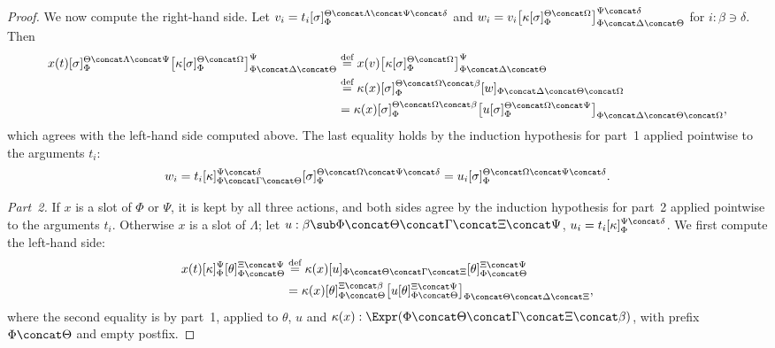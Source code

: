\begin{proof}
    We now compute the right-hand side. Let $v_i = t_i[\sigma]_\Phi^{\Theta \concat \Lambda \concat \Psi \concat \delta}$ and $w_i = v_i\big[\kappa[\sigma]_\Phi^{\Theta \concat \Omega}\big]_{\Phi \concat \Delta \concat \Theta}^{\Psi \concat \delta}$ for $i : \beta \ni \delta$. Then
    \begin{align*}
        x(t)[\sigma]_\Phi^{\Theta \concat \Lambda \concat \Psi}\big[\kappa[\sigma]_\Phi^{\Theta \concat \Omega}\big]_{\Phi \concat \Delta \concat \Theta}^{\Psi}
        &\overset{\textnormal{def}}{=} x(v)\big[\kappa[\sigma]_\Phi^{\Theta \concat \Omega}\big]_{\Phi \concat \Delta \concat \Theta}^{\Psi}\\
        &\overset{\textnormal{def}}{=} \kappa(x)[\sigma]_\Phi^{\Theta \concat \Omega \concat \beta}[w]_{\Phi \concat \Delta \concat \Theta \concat \Omega}\\
        &= \kappa(x)[\sigma]_\Phi^{\Theta \concat \Omega \concat \beta}\big[u[\sigma]_\Phi^{\Theta \concat \Omega \concat \Psi}\big]_{\Phi \concat \Delta \concat \Theta \concat \Omega},
    \end{align*}
    which agrees with the left-hand side computed above. The last equality holds by the induction hypothesis for part~1 applied pointwise to the arguments $t_i$:
    \[
    w_i = t_i[\kappa]_{\Phi \concat \Gamma \concat \Theta}^{\Psi \concat \delta}[\sigma]_\Phi^{\Theta \concat \Omega \concat \Psi \concat \delta} = u_i[\sigma]_\Phi^{\Theta \concat \Omega \concat \Psi \concat \delta}.
    \]

    \emph{Part~2.} If $x$ is a slot of $\Phi$ or $\Psi$, it is kept by all three actions, and both sides agree by the induction hypothesis for part~2 applied pointwise to the arguments $t_i$. Otherwise $x$ is a slot of $\Lambda$; let $u : \beta \sub \Phi \concat \Theta \concat \Gamma \concat \Xi \concat \Psi$, $u_i = t_i[\kappa]_\Phi^{\Psi \concat \delta}$. We first compute the left-hand side:
    \begin{align*}
        x(t)[\kappa]_\Phi^\Psi[\theta]_{\Phi \concat \Theta}^{\Xi \concat \Psi}
        &\overset{\textnormal{def}}{=} \kappa(x)[u]_{\Phi \concat \Theta \concat \Gamma \concat \Xi}[\theta]_{\Phi \concat \Theta}^{\Xi \concat \Psi}\\
        &= \kappa(x)[\theta]_{\Phi \concat \Theta}^{\Xi \concat \beta}\big[u[\theta]_{\Phi \concat \Theta}^{\Xi \concat \Psi}\big]_{\Phi \concat \Theta \concat \Delta \concat \Xi},
    \end{align*}
    where the second equality is by part~1, applied to $\theta$, $u$ and $\kappa(x) : \Expr(\Phi \concat \Theta \concat \Gamma \concat \Xi \concat \beta)$, with prefix $\Phi \concat \Theta$ and empty postfix.


\end{proof}
